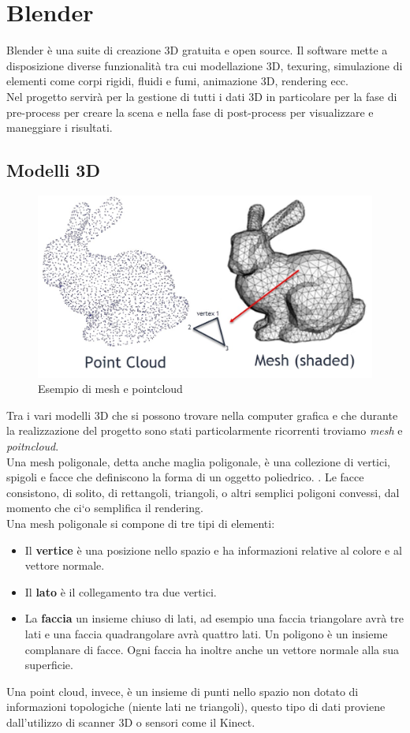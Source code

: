 \section{Blender}
Blender è una suite di creazione 3D gratuita e open source. Il software mette a disposizione diverse funzionalità tra cui modellazione 3D, texuring, simulazione di elementi come corpi rigidi, fluidi e fumi, animazione 3D, rendering ecc.\\
Nel progetto servirà per la gestione di tutti i dati 3D in particolare per la fase di pre-process per creare la scena e nella fase di post-process per visualizzare e maneggiare i risultati. 
\subsection{Modelli 3D} 
\begin{figure}
	\centering
	\includegraphics[width=0.8\linewidth]{../immagini/meshpoint}
	\caption[Mesh e Pointcloud]{Esempio di mesh e pointcloud }
	\label{fig:meshpoint}
\end{figure}
Tra i vari modelli 3D che si possono trovare nella computer grafica e che durante la realizzazione del progetto sono stati particolarmente ricorrenti troviamo \textit{mesh} e \textit{poitncloud}.\\
Una mesh poligonale, detta anche maglia poligonale, è una collezione di vertici, spigoli e facce che definiscono la forma di un oggetto poliedrico. . Le facce consistono, di
solito, di rettangoli, triangoli, o altri semplici
poligoni convessi, dal momento che ci`o
semplifica il rendering.\\
Una mesh poligonale si compone di tre tipi di elementi:
\begin{itemize}
	\item Il \textbf{vertice} è una posizione nello spazio e ha
	informazioni relative al colore e al vettore normale.
	\item Il \textbf{lato} è il collegamento tra due vertici.
	\item La \textbf{faccia} un insieme chiuso di lati, ad esempio una faccia triangolare avrà tre lati e una faccia quadrangolare avrà quattro lati. Un poligono è un insieme complanare di facce. Ogni faccia ha inoltre anche un vettore normale alla sua superficie. 
\end{itemize}
Una point cloud, invece, è un insieme di punti nello spazio non dotato di informazioni topologiche (niente lati ne triangoli), questo tipo di dati proviene dall'utilizzo di scanner 3D o sensori come il Kinect.  	 

